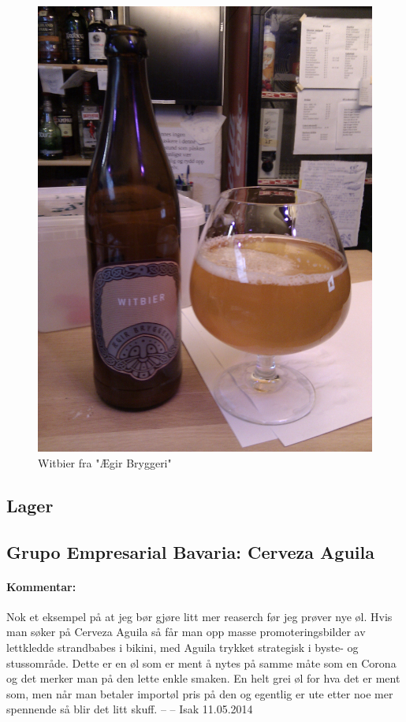 \documentclass[12pt,a4paper,oneside,norsk]{article}
\begin{document}
\begin{figure} [H]
\centering
\includegraphics[scale=0.1, angle=0]{Bilder/Ol/EgirBryggeriWitbier.jpg}
\caption{Witbier fra "Ægir Bryggeri"}
\end{figure}

\newpage
\subsection{Lager}
\subsection{Grupo Empresarial Bavaria: Cerveza Aguila}
\paragraph{Kommentar:} Nok et eksempel på at jeg bør gjøre litt mer reaserch før jeg prøver nye øl. Hvis man søker på Cerveza Aguila så får man opp masse promoteringsbilder av lettkledde strandbabes i bikini, med Aguila trykket strategisk i byste- og stussområde. Dette er en øl som er ment å nytes på samme måte som en Corona og det merker man på den lette enkle smaken. En helt grei øl for hva det er ment som, men når man betaler importøl pris på den og egentlig er ute etter noe mer spennende så blir det litt skuff. 
\newline
-- -- Isak 11.05.2014
\end{document}

